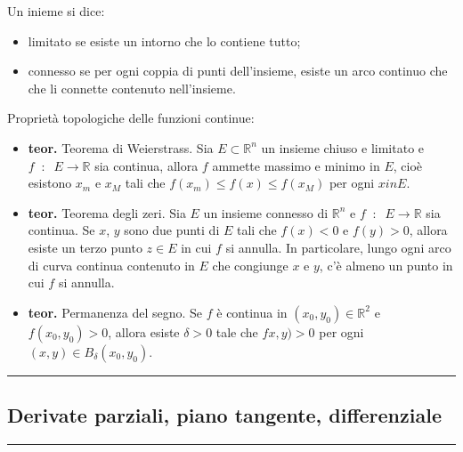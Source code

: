 Un inieme si dice:
\begin{itemize}
    \item limitato se esiste un intorno che lo contiene tutto;
    \item connesso se per ogni coppia di punti dell'insieme, esiste un arco continuo che che li connette contenuto nell'insieme.
\end{itemize}
Proprietà topologiche delle funzioni continue:
\begin{itemize}
    \item \textbf{teor.} Teorema di Weierstrass. Sia $E \subset \mathbb{R}^n$ un insieme chiuso e limitato e $f \;\;:\;\; E \rightarrow \mathbb{R}$ sia continua, allora $f$ ammette massimo e minimo in $E$, cioè esistono $x_m$ e $x_M$ tali che $f(x_m) \leq f(x) \leq f(x_M)$ per ogni $x in E$.
    \item \textbf{teor.} Teorema degli zeri. Sia $E$ un insieme connesso di $\mathbb{R}^n$ e $f \;\;:\;\; E \rightarrow \mathbb{R}$ sia continua. Se $x$, $y$ sono due punti di $E$ tali che $ f(x) < 0$ e $f(y) > 0$, allora esiste un terzo punto $z \in E$ in cui $f$ si annulla. In particolare, lungo ogni arco di curva continua contenuto in $E$ che congiunge $x$ e $y$, c'è almeno un punto in cui $f$ si annulla.
    \item \textbf{teor.} Permanenza del segno. Se $f$ è continua in $(x_0, y_0) \in \mathbb{R}^2$ e $f(x_0, y_0) > 0$, allora esiste $\delta>0$ tale che $fx,y) > 0$ per ogni $(x,y) \in B_\delta(x_0,y_0)$.
\end{itemize}
\rule{\textwidth}{2pt}
\subsection*{Derivate parziali, piano tangente, differenziale}
\rule{\textwidth}{0.4pt}
